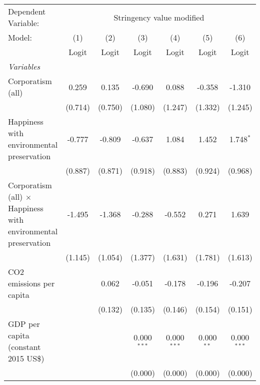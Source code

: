 
\begingroup
\centering
\begin{tabular}{lcccccc}
   \toprule
   Dependent Variable: & \multicolumn{6}{c}{Stringency value modified}\\
   Model:                                                                & (1)     & (2)     & (3)           & (4)           & (5)          & (6)\\  
                                                                         &  Logit  & Logit   & Logit         & Logit         & Logit        & Logit\\  
   \midrule
   \emph{Variables}\\
   Corporatism (all)                                                     & 0.259   & 0.135   & -0.690        & 0.088         & -0.358       & -1.310\\   
                                                                         & (0.714) & (0.750) & (1.080)       & (1.247)       & (1.332)      & (1.245)\\   
   Happiness with environmental preservation                             & -0.777  & -0.809  & -0.637        & 1.084         & 1.452        & 1.748$^{*}$\\   
                                                                         & (0.887) & (0.871) & (0.918)       & (0.883)       & (0.924)      & (0.968)\\   
   Corporatism (all) $\times$ Happiness with environmental preservation  & -1.495  & -1.368  & -0.288        & -0.552        & 0.271        & 1.639\\   
                                                                         & (1.145) & (1.054) & (1.377)       & (1.631)       & (1.781)      & (1.613)\\   
   CO2 emissions per capita                                              &         & 0.062   & -0.051        & -0.178        & -0.196       & -0.207\\   
                                                                         &         & (0.132) & (0.135)       & (0.146)       & (0.154)      & (0.151)\\   
   GDP per capita (constant 2015 US\$)                                   &         &         & 0.000$^{***}$ & 0.000$^{***}$ & 0.000$^{**}$ & 0.000$^{***}$\\   
                                                                         &         &         & (0.000)       & (0.000)       & (0.000)      & (0.000)\\   

\end{tabular}
